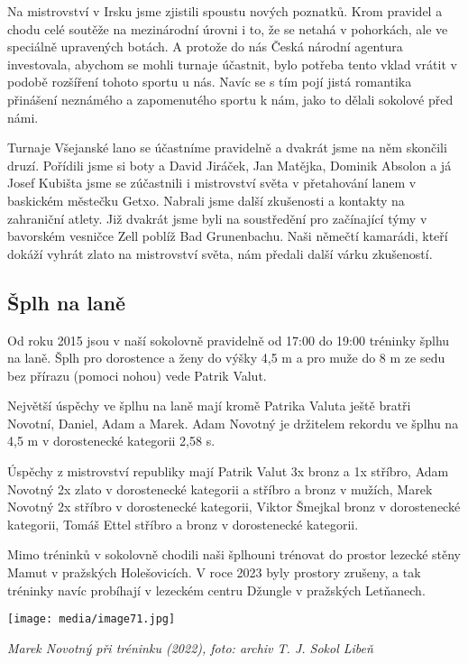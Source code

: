 Na mistrovství v Irsku jsme zjistili spoustu nových poznatků. Krom
pravidel a chodu celé soutěže na mezinárodní úrovni i to, že se netahá v
pohorkách, ale ve speciálně upravených botách. A protože do nás Česká
národní agentura investovala, abychom se mohli turnaje účastnit, bylo
potřeba tento vklad vrátit v podobě rozšíření tohoto sportu u nás. Navíc
se s tím pojí jistá romantika přinášení neznámého a zapomenutého sportu
k nám, jako to dělali sokolové před námi.

Turnaje Všejanské lano se účastníme pravidelně a dvakrát jsme na něm
skončili druzí. Pořídili jsme si boty a David Jiráček, Jan Matějka,
Dominik Absolon a já Josef Kubišta jsme se zúčastnili i mistrovství
světa v přetahování lanem v baskickém městečku Getxo. Nabrali jsme další
zkušenosti a kontakty na zahraniční atlety. Již dvakrát jsme byli na
soustředění pro začínající týmy v bavorském vesničce Zell poblíž Bad
Grunenbachu. Naši němečtí kamarádi, kteří dokáží vyhrát zlato na
mistrovství světa, nám předali další várku zkušeností.

\subsection{Šplh na laně}\label{ux161plh-na-lanux11b}

Od roku 2015 jsou v naší sokolovně pravidelně od 17:00 do 19:00 tréninky
šplhu na laně. Šplh pro dorostence a ženy do výšky 4,5 m a pro muže do 8
m ze sedu bez přírazu (pomoci nohou) vede Patrik Valut.

Největší úspěchy ve šplhu na laně mají kromě Patrika Valuta ještě bratři
Novotní, Daniel, Adam a Marek. Adam Novotný je držitelem rekordu ve
šplhu na 4,5 m v dorostenecké kategorii 2,58 s.

Úspěchy z mistrovství republiky mají Patrik Valut 3x bronz a 1x stříbro,
Adam Novotný 2x zlato v dorostenecké kategorii a stříbro a bronz v
mužích, Marek Novotný 2x stříbro v dorostenecké kategorii, Viktor
Šmejkal bronz v dorostenecké kategorii, Tomáš Ettel stříbro a bronz v
dorostenecké kategorii.

Mimo tréninků v sokolovně chodili naši šplhouni trénovat do prostor
lezecké stěny Mamut v pražských Holešovicích. V roce 2023 byly prostory
zrušeny, a tak tréninky navíc probíhají v lezeckém centru Džungle v
pražských Letňanech.

\texttt{[image: media/image71.jpg]}

\emph{Marek Novotný při tréninku (2022), foto: archiv T. J. Sokol Libeň}

